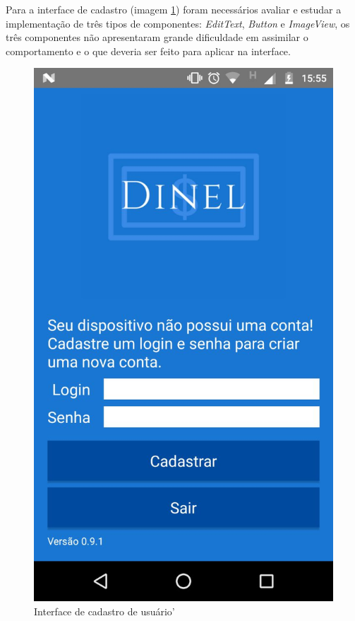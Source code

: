 \documentclass[hidelinks,12pt]{article}
\begin{document}
Para a interface de cadastro (imagem \ref{cadastro}) foram necess\'arios avaliar e estudar a implementa\c{c}\~ao de três tipos de componentes: \textit{EditText}, \textit{Button} e \textit{ImageView}, os três componentes n\~ao apresentaram grande dificuldade em assimilar o comportamento e o que deveria ser feito para aplicar na interface.
\begin{figure}[H]
	\centering
	\includegraphics[scale=0.3]{cadastro} 
	\caption{Interface de cadastro de usu\'ario'}
	\label{cadastro}
\end{figure}
\end{document}
